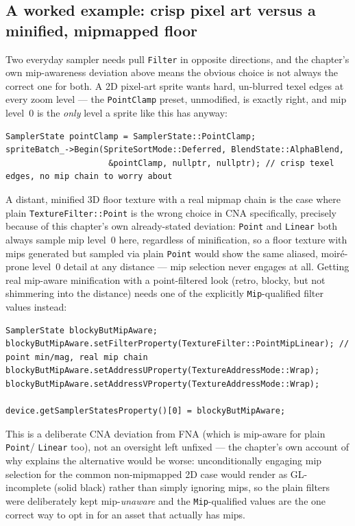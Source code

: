 \subsection{A worked example: crisp pixel art versus a minified, mipmapped floor}

Two everyday sampler needs pull \texttt{Filter} in opposite directions, and the chapter's own
mip-awareness deviation above means the obvious choice is not always the correct one for both.
A 2D pixel-art sprite wants hard, un-blurred texel edges at every zoom level --- the
\texttt{PointClamp} preset, unmodified, is exactly right, and mip level~0 is the \emph{only}
level a sprite like this has anyway:

\begin{lstlisting}
SamplerState pointClamp = SamplerState::PointClamp;
spriteBatch_->Begin(SpriteSortMode::Deferred, BlendState::AlphaBlend,
                     &pointClamp, nullptr, nullptr); // crisp texel edges, no mip chain to worry about
\end{lstlisting}

A distant, minified 3D floor texture with a real mipmap chain is the case where plain
\texttt{TextureFilter::Point} is the wrong choice in CNA specifically, precisely because of this
chapter's own already-stated deviation: \texttt{Point} and \texttt{Linear} both always sample mip
level~0 here, regardless of minification, so a floor texture with mips generated but sampled via
plain \texttt{Point} would show the same aliased, moir\'e-prone level~0 detail at any distance ---
mip selection never engages at all. Getting real mip-aware minification with a point-filtered
look (retro, blocky, but not shimmering into the distance) needs one of the explicitly
\texttt{Mip}-qualified filter values instead:

\begin{lstlisting}
SamplerState blockyButMipAware;
blockyButMipAware.setFilterProperty(TextureFilter::PointMipLinear); // point min/mag, real mip chain
blockyButMipAware.setAddressUProperty(TextureAddressMode::Wrap);
blockyButMipAware.setAddressVProperty(TextureAddressMode::Wrap);

device.getSamplerStatesProperty()[0] = blockyButMipAware;
\end{lstlisting}

This is a deliberate CNA deviation from FNA (which is mip-aware for plain \texttt{Point}/
\texttt{Linear} too), not an oversight left unfixed --- the chapter's own account of why explains
the alternative would be worse: unconditionally engaging mip selection for the common
non-mipmapped 2D case would render as GL-incomplete (solid black) rather than simply ignoring
mips, so the plain filters were deliberately kept mip-\emph{unaware} and the \texttt{Mip}-qualified
values are the one correct way to opt in for an asset that actually has mips.

